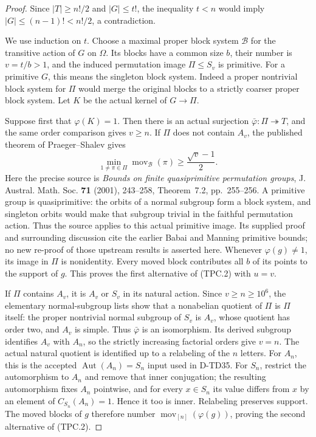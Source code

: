 \begin{proof}
Since $|T|\ge n!/2$ and $|G|\le t!$, the inequality $t<n$
would imply $|G|\le(n-1)!<n!/2$, a contradiction.

We use induction on $t$.  Choose a maximal proper block system
$\mathcal B$ for the transitive action of $G$ on $\Omega$.
Its blocks have a common size $b$, their number is $v=t/b>1$,
and the induced permutation image $\Pi\le S_v$ is primitive.
For a primitive $G$, this means the singleton block system.
Indeed a proper nontrivial block system for $\Pi$ would merge
the original blocks to a strictly coarser proper block system.
Let $K$ be the actual kernel of $G\to\Pi$.

Suppose first that $\varphi(K)=1$.  Then there is an actual
surjection $\bar\varphi:\Pi\twoheadrightarrow T$, and the same
order comparison gives $v\ge n$.  If $\Pi$ does not contain
$A_v$, the published theorem of Praeger--Shalev gives
\[
 \min_{1\ne\pi\in\Pi}\operatorname{mov}_{\mathcal B}(\pi)
                       \ge\frac{\sqrt v-1}{2}.
 \tag{TPC.3}
\]
Here the precise source is \emph{Bounds on finite quasiprimitive
permutation groups}, J. Austral. Math. Soc. \textbf{71} (2001),
243--258, Theorem~7.2, pp.~255--256.\cite{TD:PraegerShalev2001}
A primitive group is quasiprimitive: the orbits of a normal subgroup
form a block system, and singleton orbits would make that subgroup
trivial in the faithful permutation action.  Thus the source applies
to this actual primitive image.  Its supplied proof and surrounding
discussion cite the earlier Babai and Manning primitive bounds;
no new re-proof of those upstream results is asserted here.
Whenever $\varphi(g)\ne1$, its image in $\Pi$ is nonidentity.
Every moved block contributes all $b$ of its points to the support
of $g$.  This proves the first alternative of (TPC.2) with $u=v$.

If $\Pi$ contains $A_v$, it is $A_v$ or $S_v$ in its natural
action.  Since $v\ge n\ge10^6$, the elementary normal-subgroup
lists show that a nonabelian quotient of $\Pi$ is $\Pi$ itself:
the proper nontrivial normal subgroup of $S_v$ is $A_v$, whose
quotient has order two, and $A_v$ is simple.
Thus $\bar\varphi$ is an isomorphism.  Its derived subgroup
identifies $A_v$ with $A_n$, so the strictly increasing factorial
orders give $v=n$.  The actual natural quotient is identified
up to a relabeling of the $n$ letters.  For $A_n$, this is the
accepted $\operatorname{Aut}(A_n)=S_n$ input used in D-TD35.
For $S_n$, restrict the automorphism to $A_n$ and remove that
inner conjugation; the resulting automorphism fixes $A_n$
pointwise, and for every $x\in S_n$ its value differs from $x$
by an element of $C_{S_n}(A_n)=1$.  Hence it too is inner.
Relabeling preserves support.  The moved blocks of $g$ therefore
number $\operatorname{mov}_{[n]}(\varphi(g))$, proving the
second alternative of (TPC.2).


\end{proof}
